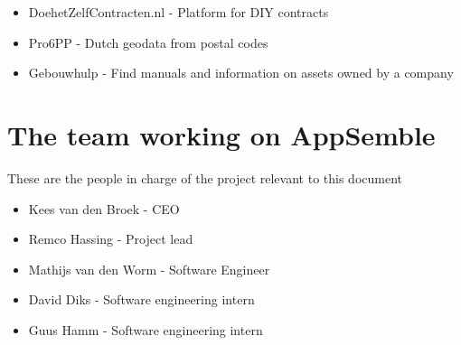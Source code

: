 \begin{itemize}
	\item DoehetZelfContracten.nl - Platform for DIY contracts
	\item Pro6PP - Dutch geodata from postal codes
	\item Gebouwhulp - Find manuals and information on assets owned by a company
\end{itemize}

\section{The team working on AppSemble}

These are the people in charge of the project relevant to this document

\begin{itemize}
	\item Kees van den Broek	- CEO
	\item Remco Hassing			- Project lead
	\item Mathijs van den Worm	- Software Engineer
	\item David Diks			- Software engineering intern
	\item Guus Hamm				- Software engineering intern
\end{itemize}